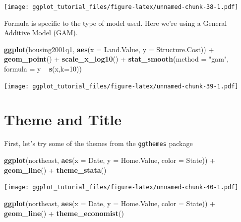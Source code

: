 \documentclass[]{article}
\newenvironment{Shaded}{\begin{snugshade}}{\end{snugshade}}
\newcommand{\KeywordTok}[1]{\textcolor[rgb]{0.13,0.29,0.53}{\textbf{{#1}}}}
\newcommand{\DataTypeTok}[1]{\textcolor[rgb]{0.13,0.29,0.53}{{#1}}}
\newcommand{\DecValTok}[1]{\textcolor[rgb]{0.00,0.00,0.81}{{#1}}}
\newcommand{\StringTok}[1]{\textcolor[rgb]{0.31,0.60,0.02}{{#1}}}
\newcommand{\NormalTok}[1]{{#1}}
\theoremstyle{definition}
\theoremstyle{definition}
\theoremstyle{definition}
\theoremstyle{remark}
\begin{document}
\texttt{[image: ggplot\_tutorial\_files/figure-latex/unnamed-chunk-38-1.pdf]}

Formula is specific to the type of model used. Here we're using a
General Additive Model (GAM).

\begin{Shaded}
\begin{Highlighting}[]
\KeywordTok{ggplot}\NormalTok{(housing2001q1, }\KeywordTok{aes}\NormalTok{(}\DataTypeTok{x =} \NormalTok{Land.Value, }\DataTypeTok{y =} \NormalTok{Structure.Cost)) +}\StringTok{ }
\StringTok{  }\KeywordTok{geom_point}\NormalTok{() +}
\StringTok{  }\KeywordTok{scale_x_log10}\NormalTok{() +}
\StringTok{  }\KeywordTok{stat_smooth}\NormalTok{(}\DataTypeTok{method =} \StringTok{"gam"}\NormalTok{, }\DataTypeTok{formula =} \NormalTok{y ~}\StringTok{ }\KeywordTok{s}\NormalTok{(x,}\DataTypeTok{k=}\DecValTok{10}\NormalTok{))}
\end{Highlighting}
\end{Shaded}

\texttt{[image: ggplot\_tutorial\_files/figure-latex/unnamed-chunk-39-1.pdf]}

\section{Theme and Title}\label{theme-and-title}

First, let's try some of the themes from the \texttt{ggthemes} package

\begin{Shaded}
\begin{Highlighting}[]
\KeywordTok{ggplot}\NormalTok{(northeast, }\KeywordTok{aes}\NormalTok{(}\DataTypeTok{x =} \NormalTok{Date, }\DataTypeTok{y =} \NormalTok{Home.Value, }\DataTypeTok{color =} \NormalTok{State)) +}
\StringTok{  }\KeywordTok{geom_line}\NormalTok{() +}
\StringTok{  }\KeywordTok{theme_stata}\NormalTok{()}
\end{Highlighting}
\end{Shaded}

\texttt{[image: ggplot\_tutorial\_files/figure-latex/unnamed-chunk-40-1.pdf]}

\begin{Shaded}
\begin{Highlighting}[]
\KeywordTok{ggplot}\NormalTok{(northeast, }\KeywordTok{aes}\NormalTok{(}\DataTypeTok{x =} \NormalTok{Date, }\DataTypeTok{y =} \NormalTok{Home.Value, }\DataTypeTok{color =} \NormalTok{State)) +}
\StringTok{  }\KeywordTok{geom_line}\NormalTok{() +}
\StringTok{  }\KeywordTok{theme_economist}\NormalTok{()}
\end{Highlighting}
\end{Shaded}
\end{document}
